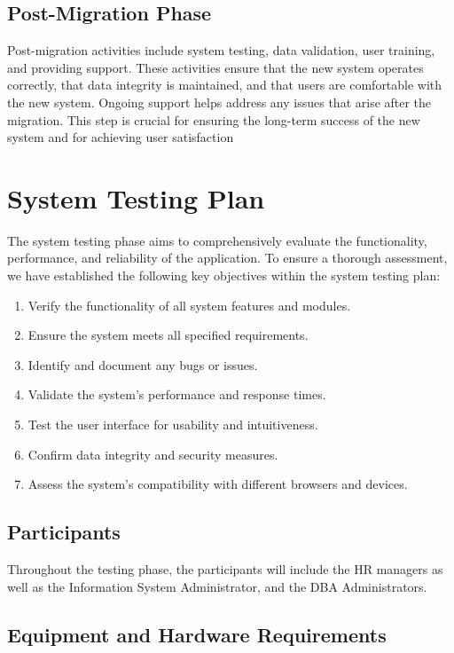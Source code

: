     \subsection{Post-Migration Phase}
        Post-migration activities include system testing, data validation, user training, and providing support. These activities ensure that the new system operates correctly, that data integrity is maintained, and that users are comfortable with the new system. Ongoing support helps address any issues that arise after the migration. This step is crucial for ensuring the long-term success of the new system and for achieving user satisfaction
    
\section{System Testing Plan}

    The system testing phase aims to comprehensively evaluate the functionality, performance, and reliability of the application. To ensure a thorough assessment, we have established the following key objectives within the system testing plan:
    
    \begin{enumerate}
        \item Verify the functionality of all system features and modules.
        \item Ensure the system meets all specified requirements.
        \item Identify and document any bugs or issues.
        \item Validate the system's performance and response times.
        \item Test the user interface for usability and intuitiveness.
        \item Confirm data integrity and security measures.
        \item Assess the system's compatibility with different browsers and devices.
    \end{enumerate}

    \subsection{Participants}

    Throughout the testing phase, the participants will include the HR managers as well as the Information System Administrator, and the DBA Administrators.

    \subsection{Equipment and Hardware Requirements}

